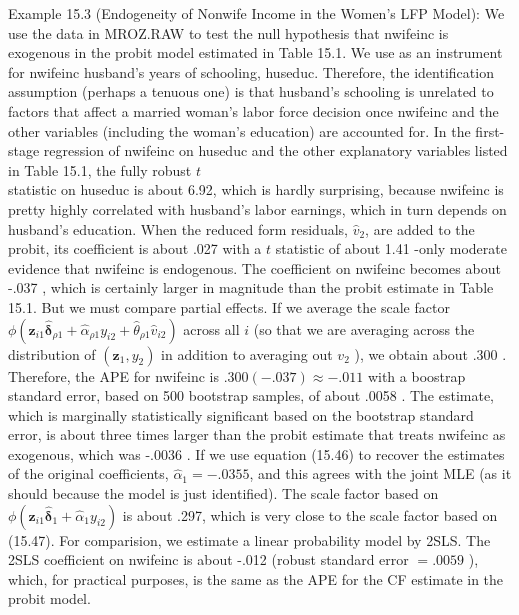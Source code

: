 \documentclass[10pt]{article}
\begin{document}
Example 15.3 (Endogeneity of Nonwife Income in the Women's LFP Model): We use the data in MROZ.RAW to test the null hypothesis that nwifeinc is exogenous in the probit model estimated in Table 15.1. We use as an instrument for nwifeinc husband's years of schooling, huseduc. Therefore, the identification assumption (perhaps a tenuous one) is that husband's schooling is unrelated to factors that affect a married woman's labor force decision once nwifeinc and the other variables (including the woman's education) are accounted for. In the first-stage regression of nwifeinc on huseduc and the other explanatory variables listed in Table 15.1, the fully robust $t$\\
statistic on huseduc is about 6.92, which is hardly surprising, because nwifeinc is pretty highly correlated with husband's labor earnings, which in turn depends on husband's education. When the reduced form residuals, $\hat{v}_{2}$, are added to the probit, its coefficient is about .027 with a $t$ statistic of about 1.41 -only moderate evidence that nwifeinc is endogenous. The coefficient on nwifeinc becomes about -.037 , which is certainly larger in magnitude than the probit estimate in Table 15.1. But we must compare partial effects. If we average the scale factor $\phi\left(\mathbf{z}_{i 1} \hat{\boldsymbol{\delta}}_{\rho 1}+\hat{\alpha}_{\rho 1} y_{i 2}+\hat{\theta}_{\rho 1} \hat{v}_{i 2}\right)$ across all $i$ (so that we are averaging across the distribution of $\left(\mathbf{z}_{1}, y_{2}\right)$ in addition to averaging out $v_{2}$ ), we obtain about .300 . Therefore, the APE for nwifeinc is $.300(-.037) \approx-.011$ with a boostrap standard error, based on 500 bootstrap samples, of about .0058 . The estimate, which is marginally statistically significant based on the bootstrap standard error, is about three times larger than the probit estimate that treats nwifeinc as exogenous, which was -.0036 . If we use equation (15.46) to recover the estimates of the original coefficients, $\hat{\alpha}_{1}=-.0355$, and this agrees with the joint MLE (as it should because the model is just identified). The scale factor based on $\phi\left(\mathbf{z}_{i 1} \hat{\boldsymbol{\delta}}_{1}+\hat{\alpha}_{1} y_{i 2}\right)$ is about .297, which is very close to the scale factor based on (15.47). For comparision, we estimate a linear probability model by 2SLS. The 2SLS coefficient on nwifeinc is about -.012 (robust standard error $=.0059$ ), which, for practical purposes, is the same as the APE for the CF estimate in the probit model.
\end{document}

